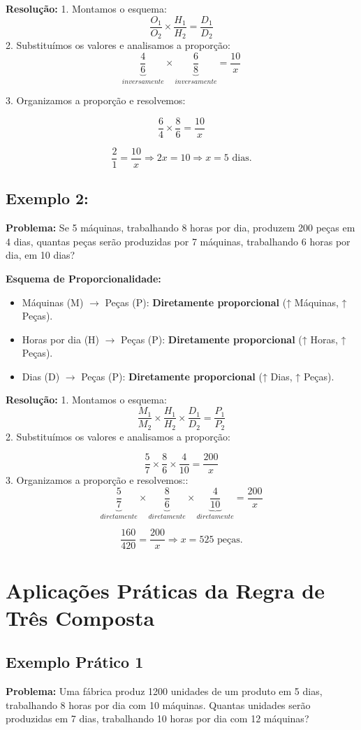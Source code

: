\documentclass[12pt]{article}
\begin{document}
\begin{multicols}{2}
\textbf{Resolução:}
1. Montamos o esquema:
\[
\frac{O_1}{O_2} \times \frac{H_1}{H_2} = \frac{D_1}{D_2}
\]
2. Substituímos os valores e analisamos a proporção:
\[
    \underbrace{\frac{4}{6}}_{inversamente} \times \underbrace{\frac{6}{8}}_{inversamente} = \frac{10}{x}
\]

3. Organizamos a proporção e resolvemos:

\[
    \frac{6}{4} \times \frac{8}{6} = \frac{10}{x}
\]

\[
\frac{2}{1} = \frac{10}{x} \Rightarrow 2x = 10  \Rightarrow x = 5 \text{ dias.}
\]

\subsection*{Exemplo 2:}
\textbf{Problema:} Se 5 máquinas, trabalhando 8 horas por dia, produzem 200 peças em 4 dias, quantas peças serão produzidas por 7 máquinas, trabalhando 6 horas por dia, em 10 dias?

\textbf{Esquema de Proporcionalidade:}
\begin{itemize}
    \item Máquinas (M) $\rightarrow$ Peças (P): \textbf{Diretamente proporcional} (↑ Máquinas, ↑ Peças).
    \item Horas por dia (H) $\rightarrow$ Peças (P): \textbf{Diretamente proporcional} (↑ Horas, ↑ Peças).
    \item Dias (D) $\rightarrow$ Peças (P): \textbf{Diretamente proporcional} (↑ Dias, ↑ Peças).
\end{itemize}

\textbf{Resolução:}
1. Montamos o esquema:
\[
\frac{M_1}{M_2} \times \frac{H_1}{H_2} \times \frac{D_1}{D_2} = \frac{P_1}{P_2}
\]
2. Substituímos os valores e analisamos a proporção:

\[
\frac{5}{7} \times \frac{8}{6} \times \frac{4}{10} = \frac{200}{x}
\]
3. Organizamos a proporção e resolvemos::
\[
    \underbrace{\frac{5}{7}}_{diretamente} \times \underbrace{\frac{8}{6}}_{diretamente}
    \times\underbrace{\frac{4}{10}}_{diretamente} = \frac{200}{x}
\]

\[
\frac{160}{420} = \frac{200}{x} \Rightarrow x = 525 \text{ peças.}
\]

\section*{Aplicações Práticas da Regra de Três Composta}

\subsection*{Exemplo Prático 1}
\textbf{Problema:} Uma fábrica produz 1200 unidades de um produto em 5 dias, trabalhando 8 horas por dia com 10 máquinas. Quantas unidades serão produzidas em 7 dias, trabalhando 10 horas por dia com 12 máquinas?


\end{multicols}
\end{document}
